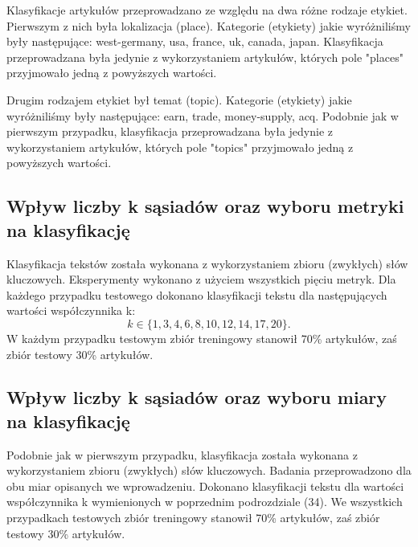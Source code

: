 \documentclass{classrep}
\begin{document}
Klasyfikacje artykułów przeprowadzano ze względu na dwa różne rodzaje etykiet. Pierwszym z nich była lokalizacja (place). Kategorie (etykiety) jakie wyróżniliśmy były następujące: west-germany, usa, france, uk, canada, japan. Klasyfikacja przeprowadzana była jedynie z wykorzystaniem artykułów, których pole "places" przyjmowało jedną z powyższych wartości. \newline

Drugim rodzajem etykiet był temat (topic). Kategorie (etykiety) jakie wyróżniliśmy były następujące: earn, trade, money-supply, acq. Podobnie jak w pierwszym przypadku, klasyfikacja przeprowadzana była jedynie z wykorzystaniem artykułów, których pole "topics" przyjmowało jedną z powyższych wartości.

\subsection{Wpływ liczby k sąsiadów oraz wyboru metryki na klasyfikację}
Klasyfikacja tekstów została wykonana z wykorzystaniem zbioru (zwykłych) słów kluczowych. Eksperymenty wykonano z użyciem wszystkich pięciu metryk. Dla każdego przypadku testowego dokonano klasyfikacji tekstu dla następujących wartości współczynnika k:
\begin{equation}
            k \in \{1, 3, 4, 6, 8, 10, 12, 14, 17, 20\}.
 \end{equation}
W każdym przypadku testowym zbiór treningowy stanowił 70\% artykułów, zaś zbiór testowy 30\% artykułów.

\subsection{Wpływ liczby k sąsiadów oraz wyboru miary na klasyfikację}
Podobnie jak w pierwszym przypadku, klasyfikacja została wykonana z wykorzystaniem zbioru (zwykłych) słów kluczowych. Badania przeprowadzono dla obu miar opisanych we wprowadzeniu. Dokonano klasyfikacji tekstu dla wartości współczynnika k wymienionych w poprzednim podrozdziale (34). We wszystkich przypadkach testowych zbiór treningowy stanowił 70\% artykułów, zaś zbiór testowy 30\% artykułów.
\end{document}
